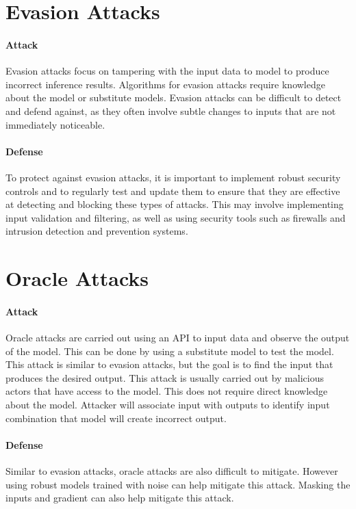 \documentclass[11pt]{article}
\begin{document}
\section{Evasion Attacks}
\label{sec:evasion}

\paragraph{Attack}{
    Evasion attacks focus on tampering with the input data to model to produce incorrect inference results. Algorithms for evasion attacks require knowledge about the model or substitute models. Evasion attacks can be difficult to detect and defend against, as they often involve subtle changes to inputs that are not immediately noticeable.
}

\paragraph{Defense}{
    To protect against evasion attacks, it is important to implement robust security controls and to regularly test and update them to ensure that they are effective at detecting and blocking these types of attacks. This may involve implementing input validation and filtering, as well as using security tools such as firewalls and intrusion detection and prevention systems.
}

\section{Oracle Attacks}
\label{sec:oracle}

\paragraph{Attack}{
    Oracle attacks are carried out using an API to input data and observe the output of the model. This can be done by using a substitute model to test the model. This attack is similar to evasion attacks, but the goal is to find the input that produces the desired output. This attack is usually carried out by malicious actors that have access to the model. This does not require direct knowledge about the model. Attacker will associate input with outputs to identify input combination that model will create incorrect output.
}

\paragraph{Defense}{
    Similar to evasion attacks, oracle attacks are also difficult to mitigate. However using robust models trained with noise can help mitigate this attack. Masking the inputs and gradient can also help mitigate this attack.
}
\end{document}
